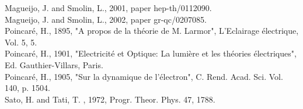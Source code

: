 \documentclass[a4paper,12pt,dvips]{article}
\begin{document}
Magueijo, J. and Smolin, L., 2001, paper hep-th/0112090. \\
Magueijo, J. and Smolin, L., 2002, paper gr-qc/0207085. \\
Poincar\'e, H., 1895, "A propos de la th\'eorie de M. Larmor",
L'Eclairage \'electrique, Vol. 5,  5.\\
Poincar\'e, H., 1901, "Electricit\'e et Optique: La lumi\`ere
et les th\'eories \'electriques", Ed. Gauthier-Villars, Paris.\\
Poincar\'e, H., 1905, "Sur la dynamique de l'\'electron", C.
Rend. Acad. Sci. Vol. 140, p. 1504.\\
Sato, H. and Tati, T. , 1972, Progr. Theor. Phys. 47, 1788.\\
\end{document}
